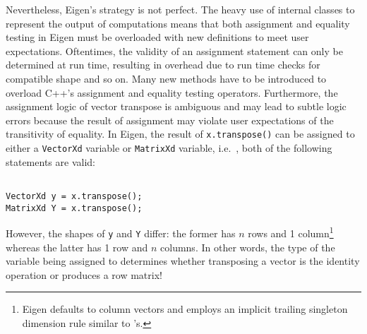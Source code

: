 Nevertheless, Eigen's strategy is not perfect. The heavy use of internal classes to represent the output of computations means that both assignment and equality testing in Eigen must be overloaded with new definitions to meet user expectations. Oftentimes, the validity of an assignment statement can only be determined at run time, resulting in overhead due to run time checks for compatible shape and so on. Many new methods have to be introduced to overload C++'s assignment and equality testing operators. Furthermore, the assignment logic of vector transpose is ambiguous and may lead to subtle logic errors because the result of assignment may violate user expectations of the transitivity of equality. In Eigen, the result of \verb|x.transpose()| can be assigned to either a \verb|VectorXd| variable or \verb|MatrixXd| variable, i.e.\ , both of the following statements are valid:

\begin{verbatim}

VectorXd y = x.transpose();
MatrixXd Y = x.transpose();

\end{verbatim}
%
However, the shapes of \verb|y| and \verb|Y| differ: the former has $n$ rows and 1 column\footnote{Eigen defaults to column vectors and employs an implicit trailing singleton dimension rule similar to 's.} whereas the latter has 1 row and $n$ columns. In other words, the type of the variable being assigned to determines whether transposing a vector is the identity operation or produces a row matrix!

